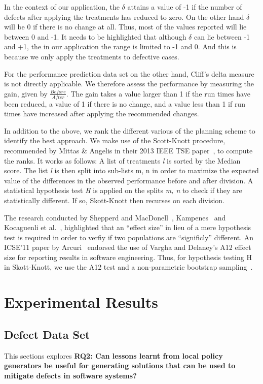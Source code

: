 \documentclass[conference]{IEEEtran}
\begin{document}
{In the context of our application, the $\delta$ attains a value of -1 if the number of defects after applying the treatments has reduced to zero. On the other hand $\delta$ will be 0 if there is no change at all. Thus, most of the values reported will lie between 0 and -1. It needs to be highlighted that although $\delta$ can lie between -1 and +1, the in our application the range is limited to -1 and 0. And this is because we only apply the treatments to defective cases. 

For the performance prediction data set on the other hand, Cliff's delta measure is not directly applicable. We therefore assess the performance by measuring the gain, given by $\frac{Before}{After}$. The gain takes a value larger than 1 if the run times have been reduced, a value of 1 if there is no change, and a value less than 1 if run times have increased after applying the recommended changes. 

In addition to the above, we rank the different various of the planning scheme to identify the best approach. We make use of the Scott-Knott procedure, recommended by Mittas \& Angelis in their 2013 IEEE TSE paper~\cite{sk}, to compute the ranks. It works as follows: A list of treatments \textit{l} is sorted by the Median score. The list \textit{l} is then split into sub-lists m, n in order to maximize the expected value of the differences in the observed performance before and after division. A statistical hypothesis test \textit{H} is applied on the splits \textit{m, n} to check if they are statistically different. If so, Skott-Knott then recurses on each division. 

The research conducted by Shepperd and MacDonell~\cite{shepperd12a}, Kampenes~\cite{kampenes07} and Kocaguenli et al.~\cite{}, highlighted that an ``effect size'' in lieu of a mere hypothesis test is required in order to verfiy if two populations are ``significly'' different. An ICSE'11 paper by Arcuri~\cite{} endorsed the use of Vargha and Delaney's A12 effect size for reporting results in software engineering. Thus, for hypothesis testing H in Skott-Knott, we use the A12 test and a non-parametric bootstrap sampling~\cite{}.

\section{Experimental Results}

\subsection{Defect Data Set}
This sections explores \textbf{RQ2: Can lessons learnt from local policy generators be useful for generating solutions that can be used to mitigate defects in software systems?}

}
\end{document}
